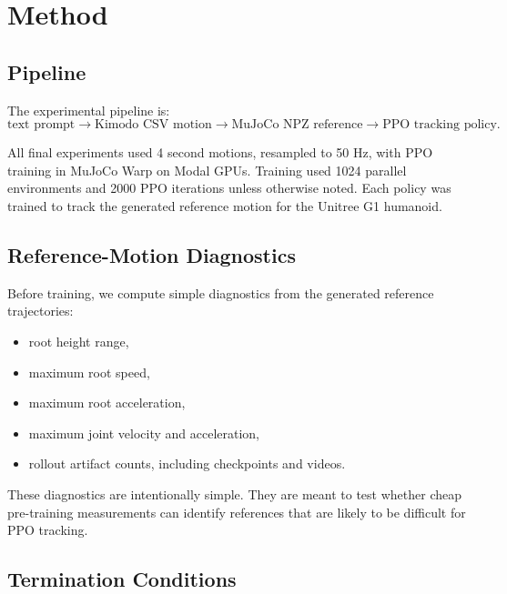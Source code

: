 \documentclass[10pt]{article}
\begin{document}
\section{Method}

\subsection{Pipeline}

The experimental pipeline is:
\[
\text{text prompt} \rightarrow \text{Kimodo CSV motion} \rightarrow \text{MuJoCo NPZ reference} \rightarrow \text{PPO tracking policy}.
\]

All final experiments used 4 second motions, resampled to 50 Hz, with PPO training in MuJoCo Warp on Modal GPUs. Training used 1024 parallel environments and 2000 PPO iterations unless otherwise noted. Each policy was trained to track the generated reference motion for the Unitree G1 humanoid.

\subsection{Reference-Motion Diagnostics}

Before training, we compute simple diagnostics from the generated reference trajectories:
\begin{itemize}
    \item root height range,
    \item maximum root speed,
    \item maximum root acceleration,
    \item maximum joint velocity and acceleration,
    \item rollout artifact counts, including checkpoints and videos.
\end{itemize}

These diagnostics are intentionally simple. They are meant to test whether cheap pre-training measurements can identify references that are likely to be difficult for PPO tracking.

\subsection{Termination Conditions}
\end{document}

